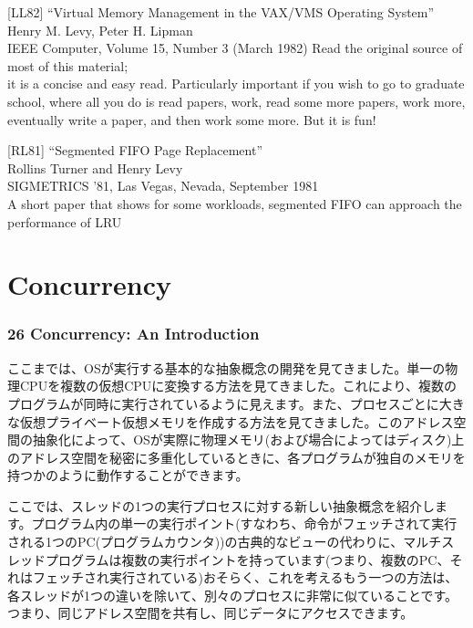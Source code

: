 {[}LL82{]} ``Virtual Memory Management in the VAX/VMS Operating
System''\\
Henry M. Levy, Peter H. Lipman\\
IEEE Computer, Volume 15, Number 3 (March 1982) Read the original source
of most of this material;\\
it is a concise and easy read. Particularly important if you wish to go
to graduate school, where all you do is read papers, work, read some
more papers, work more, eventually write a paper, and then work some
more. But it is fun!

{[}RL81{]} ``Segmented FIFO Page Replacement''\\
Rollins Turner and Henry Levy\\
SIGMETRICS '81, Las Vegas, Nevada, September 1981\\
A short paper that shows for some workloads, segmented FIFO can approach
the performance of LRU

\newpage

\part{Concurrency}

\hypertarget{concurrency-an-introduction}{%
\section*{26 Concurrency: An
Introduction}\label{concurrency-an-introduction}}

ここまでは、OSが実行する基本的な抽象概念の開発を見てきました。単一の物理CPUを複数の仮想CPUに変換する方法を見てきました。これにより、複数のプログラムが同時に実行されているように見えます。また、プロセスごとに大きな仮想プライベート仮想メモリを作成する方法を見てきました。このアドレス空間の抽象化によって、OSが実際に物理メモリ(および場合によってはディスク)上のアドレス空間を秘密に多重化しているときに、各プログラムが独自のメモリを持つかのように動作することができます。

ここでは、スレッドの1つの実行プロセスに対する新しい抽象概念を紹介します。プログラム内の単一の実行ポイント(すなわち、命令がフェッチされて実行される1つのPC(プログラムカウンタ))の古典的なビューの代わりに、マルチスレッドプログラムは複数の実行ポイントを持っています(つまり、複数のPC、それはフェッチされ実行されている)おそらく、これを考えるもう一つの方法は、各スレッドが1つの違いを除いて、別々のプロセスに非常に似ていることです。つまり、同じアドレス空間を共有し、同じデータにアクセスできます。

